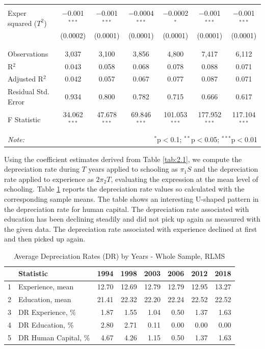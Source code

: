 \documentclass[12pt,a4paper]{article}
\numberwithin{equation}{section}
\begin{document}
\begin{table}[h!]
\begin{tabular}{@{\extracolsep{3pt}}lcccccc}
		& & & & & & \\ 
		Exper squared ($T^2$) & $-$0.001$^{***}$ & $-$0.001$^{***}$ & $-$0.0004$^{***}$ & $-$0.0002$^{*}$ & $-$0.001$^{***}$ & $-$0.001$^{***}$ \\ 
		& (0.0002) & (0.0001) & (0.0001) & (0.0001) & (0.0001) & (0.0001) \\ 
		& & & & & & \\ 
		\hline \\[-1.8ex] 
		Observations & 3,037 & 3,100 & 3,856 & 4,800 & 7,417 & 6,112 \\ 
		R$^{2}$ & 0.043 & 0.058 & 0.068 & 0.078 & 0.088 & 0.071 \\ 
		Adjusted R$^{2}$ & 0.042 & 0.057 & 0.067 & 0.077 & 0.087 & 0.071 \\ 
		Residual Std. Error & 0.934 & 0.800 & 0.782 & 0.715 & 0.666 & 0.617 \\ 
		F Statistic & 34.062$^{***}$ & 47.678$^{***}$ & 69.846$^{***}$ & 101.053$^{***}$ & 177.952$^{***}$ & 117.104$^{***}$ \\ 
		\hline 
		\hline \\[-1.8ex] 
		\textit{Note:}  & \multicolumn{6}{r}{$^{*}$p$<$0.1; $^{**}$p$<$0.05; $^{***}$p$<$0.01} \\ 
	\end{tabular} 
\end{table}


Using the coefficient estimates derived from Table \ref{tab:2.1}, we compute the depreciation rate during $T$ years applied to schooling as $\pi_{1}S $ and the depreciation rate applied to experience as $ 2\pi_{2}T$, evaluating the expression at the mean level of schooling. Table \ref{tab:2.2} reports the depreciation rate values so calculated with the corresponding sample means. The table shows an interesting U-shaped pattern in the depreciation rate for human capital. The depreciation rate associated with education has been declining steadily and did not pick up again as measured with the given data. The depreciation rate associated with experience declined at first and then picked up again. 

\begin{table}[h!]
	\centering
	\caption{Average Depreciation Rates (DR) by Years - Whole Sample, RLMS}
	\label{tab:2.2}
	\begin{tabular}{@{\extracolsep{20pt}}rlrrrrrr}
		\hline
		& \textbf{Statistic} & \textbf{1994} & \textbf{1998} & \textbf{2003} & \textbf{2006} & \textbf{2012} & \textbf{2018} \\ 
		\hline
		1 & Experience, mean & 12.70 & 12.69 & 12.79 & 12.79 & 12.95 & 13.27 \\ 
		2 & Education, mean & 21.41 & 22.32 & 22.20 & 22.24 & 22.52 & 22.52 \\ 
		\midrule
		3 & DR Experience, \% & 1.87 & 1.55 & 1.04 & 0.50 & 1.37 & 1.63 \\ 
		4 & DR Education, \% & 2.80 & 2.71 & 0.11 & 0.00 & 0.00 & 0.00 \\ 
		5 & DR Human Capital, \% & 4.67 & 4.26 & 1.15 & 0.50 & 1.37 & 1.63 \\ 
		\hline
	\end{tabular}
\end{table}
	
\end{document}
